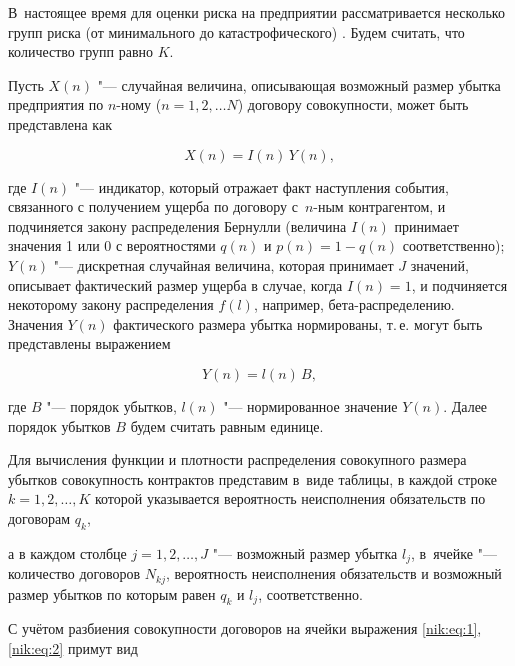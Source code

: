 В~настоящее время для оценки риска на предприятии рассматривается несколько групп риска (от минимального до катастрофического) \cite{Mihailova:bib:Granaturov}. Будем считать, что количество групп равно $K$.



Пусть $X(n)$ "--- случайная величина, описывающая возможный размер убытка предприятия по $n$-ному ($n=1, 2, \ldots N$) договору совокупности, может быть представлена как

\begin{equation}

\label{nik:eq:1}

 X(n)=I(n) \, Y(n),

\end{equation}

где $I(n)$ "--- индикатор, который отражает факт наступления события, связанного с получением ущерба по договору с~$n$-ным контрагентом, и подчиняется закону распределения Бернулли (величина $I(n)$ принимает значения 1 или 0 с вероятностями $q(n)$ и $p(n)=1-q(n)$ соответственно); $Y(n)$ "--- дискретная случайная величина, которая принимает $J$ значений, описывает фактический размер ущерба в случае, когда $I(n)=1$, и подчиняется некоторому закону распределения $f(l)$, например, бета-распределению. Значения $Y(n)$ фактического размера убытка нормированы, т.\,е. могут быть представлены выражением

\begin{equation}

\label{nik:eq:2}

Y(n)=l (n) \, B, 

\end{equation}

где $B$ "--- порядок убытков, $l(n)$ "--- нормированное значение $Y(n)$. Далее порядок убытков $B$ будем считать равным единице.



Для вычисления функции и плотности распределения совокупного размера убытков совокупность контрактов представим в~виде таблицы, в каждой строке $k=1, 2, \ldots, K$ которой указывается вероятность неисполнения обязательств по договорам $q_k$, 

а в каждом столбце  $j=1, 2,\ldots, J$ "--- возможный размер убытка $l_j$, в~ячейке "--- количество договоров  $N_{kj}$, вероятность неисполнения обязательств и возможный размер убытков по которым равен $q_{k}$ и  $l_{j}$, соответственно.

С учётом разбиения совокупности договоров на ячейки выражения \eqref{nik:eq:1}, \eqref{nik:eq:2} примут вид

